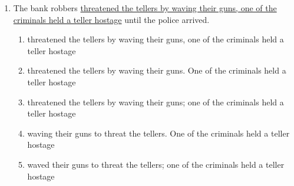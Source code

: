 \begin{enumerate}
\begin{enumerate}
\begin{spacing}{1.5}
\begin{enumerate}[label=(\Alph*)]
\hrulefill

\item Americans take the right to vote for granted according to many people, and I think that it is the right of Americans to not exercise their right to vote.

\hrulefill

\item Many people think that Americans had taken the right to vote for granted, and I think that it is has been the right of Americans to not exercise their right to vote.

\hrulefill

\item Many people think that Americans take the right to vote for granted, but I think that it is the right of Americans to not exercise their right to vote.

\hrulefill

\item Americans take the right to vote for granted, yet it is the right of Americans to not exercise their right to vote.

\hrulefill
\end{enumerate}
\end{spacing}

\bigskip
\item The bank robbers \ul{threatened the tellers by waving their guns, one of the criminals held a teller hostage} until the police arrived. 

\begin{spacing}{1.5}
\begin{enumerate}[label=(\Alph*)]
\item threatened the tellers by waving their guns, one of the criminals held a teller hostage

\hrulefill

\item threatened the tellers by waving their guns. One of the criminals held a teller hostage

\hrulefill

\item threatened the tellers by waving their guns; one of the criminals held a teller hostage

\hrulefill

\item waving their guns to threat the tellers. One of the criminals held a teller hostage

\hrulefill

\item waved their guns to threat the tellers; one of the criminals held a teller hostage


\end{enumerate}
\end{spacing}
\end{enumerate}
\end{enumerate}
